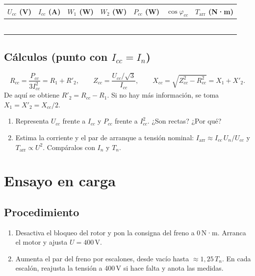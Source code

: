 \documentclass[11pt,a4paper]{article}
\begin{document}
\begin{tabularx}{\textwidth}{|C|C|C|C|C|C|C|}
  \hline
  $U_{cc}$ (V) & $I_{cc}$ (A) & $W_1$ (W) & $W_2$ (W) & $P_{cc}$ (W) & $\cos\varphi_{cc}$ & $T_\text{arr}$ (N·m) \\ \hline
   & & & & & & \\[5pt] \hline
   & & & & & & \\[5pt] \hline
   & & & & & & \\[5pt] \hline
   & & & & & & \\[5pt] \hline
   & & & & & & \\[5pt] \hline
   & & & & & & \\[5pt] \hline
\end{tabularx}

\subsection*{Cálculos (punto con $I_{cc} = I_n$)}
\[
  R_{cc} = \frac{P_{cc}}{3 I_{cc}^2} = R_1 + R'_2, \qquad
  Z_{cc} = \frac{U_{cc}/\sqrt3}{I_{cc}}, \qquad
  X_{cc} = \sqrt{Z_{cc}^2 - R_{cc}^2} = X_1 + X'_2 .
\]
De aquí se obtiene $R'_2 = R_{cc} - R_1$. Si no hay más información, se toma $X_1 = X'_2 = X_{cc}/2$.
\begin{enumerate}
  \item Representa $U_{cc}$ frente a $I_{cc}$ y $P_{cc}$ frente a $I_{cc}^2$. ¿Son rectas? ¿Por qué?
  \item Estima la corriente y el par de arranque a tensión nominal: $I_\text{arr} \approx I_{cc}\,U_n/U_{cc}$ y $T_\text{arr} \propto U^2$. Compáralos con $I_n$ y $T_n$.
\end{enumerate}

\section{Ensayo en carga}
\subsection*{Procedimiento}
\begin{enumerate}
  \item Desactiva el bloqueo del rotor y pon la consigna del freno a 0\,N·m. Arranca el motor y ajusta $U = 400$\,V.
  \item Aumenta el par del freno por escalones, desde vacío hasta $\approx 1{,}25\,T_n$. En cada escalón, reajusta la tensión a 400\,V si hace falta y anota las medidas.
\end{enumerate}
\end{document}

